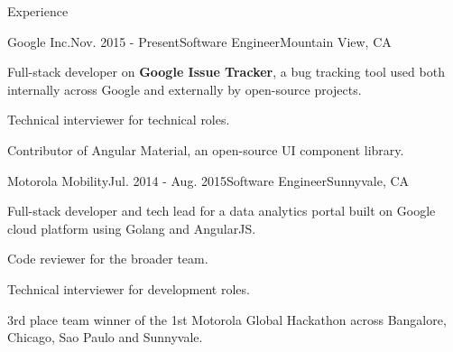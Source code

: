 \documentclass{resume} %
\begin{document}
\begin{rSection}{Experience}

\begin{rSubsection}{Google Inc.}{Nov. 2015 - Present}{Software Engineer}{Mountain View, CA}
\item Full-stack developer on \textbf{Google Issue Tracker}, a bug tracking tool used both internally across Google and externally by open-source projects.
\item Technical interviewer for technical roles.
\item Contributor of Angular Material, an open-source UI component library.

\end{rSubsection}

\begin{rSubsection}{Motorola Mobility}{Jul. 2014 - Aug. 2015}{Software Engineer}{Sunnyvale, CA}
\item Full-stack developer and tech lead for a data analytics portal built on Google cloud platform using Golang and AngularJS.
\item Code reviewer for the broader team.
\item Technical interviewer for development roles.
\item 3rd place team winner of the 1st Motorola Global Hackathon across Bangalore, Chicago, Sao Paulo and Sunnyvale.
\end{rSubsection}



\end{rSection}
\end{document}
